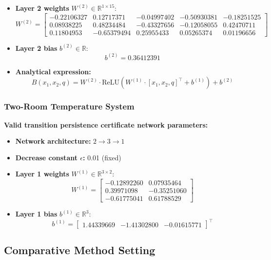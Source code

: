 \begin{itemize}
	    \item \textbf{Layer 2 weights} $W^{(2)} \in \mathbb{R}^{1 \times 15}$:
	    {\footnotesize
	    \[
	    W^{(2)} = \begin{bmatrix}
	    -0.22106327 &  0.12717371 & -0.04997402 & -0.50930381 & -0.18251525 \\
	     0.08938225 &  0.48234484 & -0.43327656 & -0.12058055 &  0.42470711 \\
	     0.11804953 & -0.65379494 &  0.25955433 &  0.05265374 &  0.01196656
	    \end{bmatrix}
	    \]}
	    
	    \item \textbf{Layer 2 bias} $b^{(2)} \in \mathbb{R}$:
	    \[
	    b^{(2)} = 0.36412391
	    \]
	    
	    \item \textbf{Analytical expression:}
	    \[
	    B(x_1, x_2, q) = W^{(2)} \cdot \text{ReLU}(W^{(1)} \cdot [x_1, x_2, q]^\top + b^{(1)}) + b^{(2)}
	    \]
	\end{itemize}

\subsubsection{Two-Room Temperature System}
\label{app:two_room_neural}
\textbf{Valid transition persistence certificate network parameters:}

\begin{itemize}
    \item \textbf{Network architecture:} $2 \rightarrow 3 \rightarrow 1$
    \item \textbf{Decrease constant $\epsilon$:} 0.01 (fixed)
    \item \textbf{Layer 1 weights} $W^{(1)} \in \mathbb{R}^{3 \times 2}$:
    \[
    W^{(1)} = \begin{bmatrix}
    -0.12892260 &  0.07935464 \\
     0.39971098 & -0.35251060 \\
    -0.61775041 &  0.61788529
    \end{bmatrix}
    \]
    
    \item \textbf{Layer 1 bias} $b^{(1)} \in \mathbb{R}^{3}$:
    \[
    b^{(1)} = \begin{bmatrix}
     1.44339669 & -1.41302800 & -0.01615771
    \end{bmatrix}^\top
    \]
\end{itemize}

\subsection{Comparative Method Setting}

